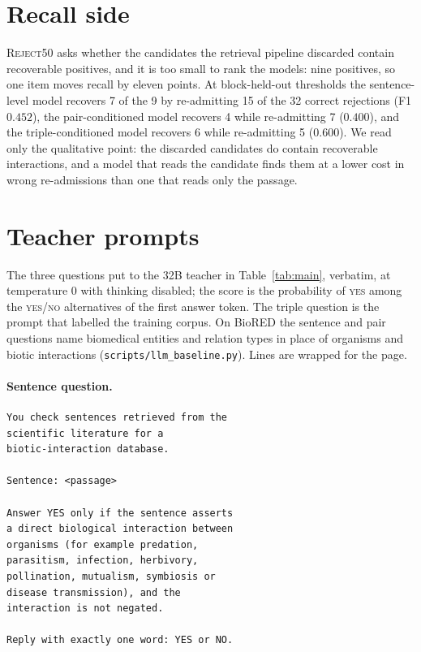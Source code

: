 \documentclass[11pt]{article}
\begin{document}
\section{Recall side}
\label{sec:recall}
\textsc{Reject50} asks whether the candidates the retrieval pipeline discarded contain recoverable
positives, and it is too small to rank the models: nine positives, so one item moves recall by
eleven points. At block-held-out thresholds the sentence-level model recovers 7 of the 9 by
re-admitting 15 of the 32 correct rejections (F1 $0.452$), the pair-conditioned model recovers 4
while re-admitting 7 ($0.400$), and the triple-conditioned model recovers 6 while re-admitting 5
($0.600$). We read only the qualitative point: the discarded candidates do contain recoverable
interactions, and a model that reads the candidate finds them at a lower cost in wrong
re-admissions than one that reads only the passage.

\section{Teacher prompts}
\label{app:prompts}

The three questions put to the 32B teacher in Table~\ref{tab:main}, verbatim, at temperature 0 with
thinking disabled; the score is the probability of \textsc{yes} among the \textsc{yes}/\textsc{no}
alternatives of the first answer token. The triple question is the prompt that labelled the
training corpus. On BioRED the sentence and pair questions name biomedical entities and relation
types in place of organisms and biotic interactions (\texttt{scripts/llm\_baseline.py}). Lines are wrapped for the page.

\paragraph{Sentence question.}
\begin{footnotesize}
\begin{verbatim}
You check sentences retrieved from the
scientific literature for a
biotic-interaction database.

Sentence: <passage>

Answer YES only if the sentence asserts
a direct biological interaction between
organisms (for example predation,
parasitism, infection, herbivory,
pollination, mutualism, symbiosis or
disease transmission), and the
interaction is not negated.

Reply with exactly one word: YES or NO.
\end{verbatim}
\end{footnotesize}
\end{document}

